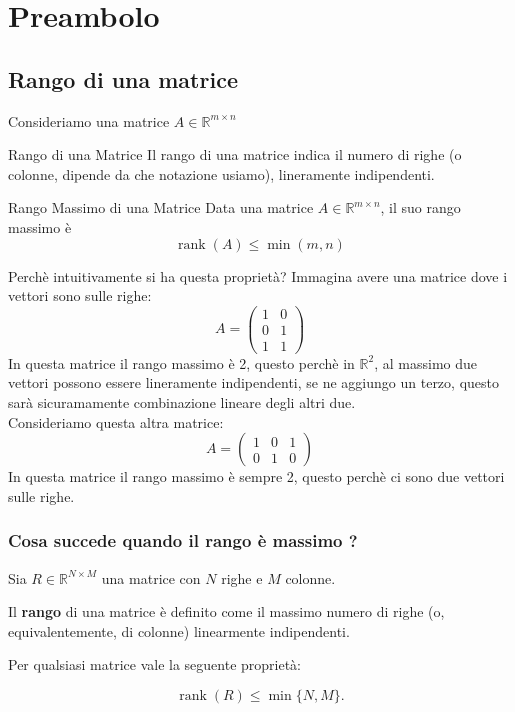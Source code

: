 \chapter{Preambolo}
\section{Rango di una matrice}
Consideriamo una matrice $A \in \mathbb{R} ^ {m \times n}$
\begin{definition}{Rango di una Matrice}
    Il rango di una matrice indica il numero di righe (o colonne, dipende da che notazione usiamo), lineramente indipendenti.
\end{definition}
\begin{proposition}{Rango Massimo di una Matrice}
Data una matrice \(A \in \mathbb{R}^{m \times n}\), il suo rango massimo è
\[
\boxed{\operatorname{rank}(A) \leq \min(m,n)}
\]
\end{proposition}
Perchè intuitivamente si ha questa proprietà?
Immagina avere una matrice dove i vettori sono sulle righe:
\[
A=
\begin{pmatrix}
1&0\\
0&1\\
1&1
\end{pmatrix}
\]
In questa matrice il rango massimo è 2, questo perchè in $\mathbb{R}^2$, al massimo due vettori possono essere lineramente indipendenti, se ne aggiungo un terzo, questo sarà sicuramamente combinazione lineare degli altri due. \\
Consideriamo questa altra matrice:
\[
A=
\begin{pmatrix}
1&0&1\\
0&1&0
\end{pmatrix}
\]
In questa matrice il rango massimo è sempre 2, questo perchè ci sono due vettori sulle righe.


\subsection{Cosa succede quando il rango è massimo ?}

Sia $R \in \mathbb{R}^{N \times M}$ una matrice con $N$ righe e $M$ colonne.

Il \textbf{rango} di una matrice è definito come il massimo numero di righe (o, equivalentemente, di colonne) linearmente indipendenti.

Per qualsiasi matrice vale la seguente proprietà:

\[
    \operatorname{rank}(R) \leq \min\{N,M\}.
\]

